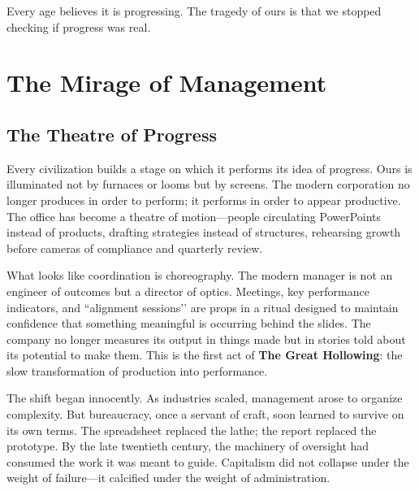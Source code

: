 \documentclass[11pt,twoside]{book}
\begin{document}
Every age believes it is progressing. The tragedy of ours is that we stopped checking if progress was real.

\newcommand{\CJKtrad}[1]{{\begin{CJK*}{UTF8}{bsmi}#1\end{CJK*}}}
\newcommand{\CJKsimp}[1]{{\begin{CJK*}{UTF8}{gbsn}#1\end{CJK*}}}

\mainmatter

\part{The Mirage of Management}
% 

\chapter{The Theatre of Progress}
\label{ch:01}

Every civilization builds a stage on which it performs its idea of progress.  
Ours is illuminated not by furnaces or looms but by screens.  The modern corporation no longer produces in order to perform; it performs in order to appear productive.  The office has become a theatre of motion—people circulating PowerPoints instead of products, drafting strategies instead of structures, rehearsing growth before cameras of compliance and quarterly review.  

What looks like coordination is choreography.  The modern manager is not an engineer of outcomes but a director of optics.  Meetings, key performance indicators, and “alignment sessions’’ are props in a ritual designed to maintain confidence that something meaningful is occurring behind the slides.  The company no longer measures its output in things made but in stories told about its potential to make them.  This is the first act of \textbf{The Great Hollowing}: the slow transformation of production into performance.

The shift began innocently.  As industries scaled, management arose to organize complexity.  But bureaucracy, once a servant of craft, soon learned to survive on its own terms.  The spreadsheet replaced the lathe; the report replaced the prototype.  By the late twentieth century, the machinery of oversight had consumed the work it was meant to guide.  Capitalism did not collapse under the weight of failure—it calcified under the weight of administration.  
\end{document}
